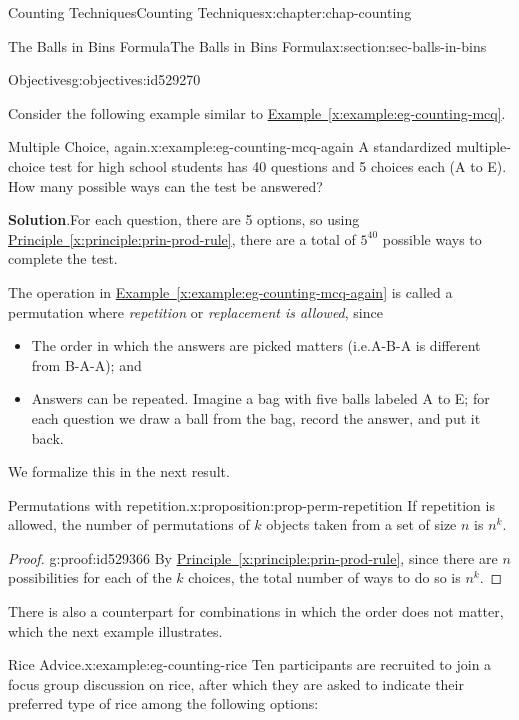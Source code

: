 \documentclass[oneside,10pt,]{book}
\newcommand{\blocktitlefont}{\relax}
\newcommand{\xreffont}{\relax}
\numberwithin{equation}{section}
\begin{document}
\begin{chapterptx}{Counting Techniques}{}{Counting Techniques}{}{}{x:chapter:chap-counting}
\begin{sectionptx}{The Balls in Bins Formula}{}{The Balls in Bins Formula}{}{}{x:section:sec-balls-in-bins}
\begin{objectives}{Objectives}{g:objectives:id529270}
\begin{itemize}[label=\textbullet]
\end{itemize}
\end{objectives}
Consider the following example similar to \hyperref[x:example:eg-counting-mcq]{Example~{\xreffont\ref{x:example:eg-counting-mcq}}}.%
\begin{example}{Multiple Choice, again.}{x:example:eg-counting-mcq-again}%
A standardized multiple-choice test for high school students has 40 questions and 5 choices each (A to E). How many possible ways can the test be answered?%
\par\smallskip%
\noindent\textbf{\blocktitlefont Solution}.\hypertarget{g:solution:id529277}{}\quad{}For each question, there are 5 options, so using \hyperref[x:principle:prin-prod-rule]{Principle~{\xreffont\ref{x:principle:prin-prod-rule}}}, there are a total of \(5^{40}\) possible ways to complete the test.%
\end{example}
The operation in \hyperref[x:example:eg-counting-mcq-again]{Example~{\xreffont\ref{x:example:eg-counting-mcq-again}}} is called a permutation where \emph{repetition} or \emph{replacement is allowed}, since%
\begin{itemize}[label=\textbullet]
\item{}The order in which the answers are picked matters (i.e.\@ A-B-A is different from B-A-A); and%
\item{}Answers can be repeated. Imagine a bag with five balls labeled A to E; for each question we draw a ball from the bag, record the answer, and put it back.%
\end{itemize}
We formalize this in the next result.%
\begin{proposition}{Permutations with repetition.}{}{x:proposition:prop-perm-repetition}%
If repetition is allowed, the number of permutations of \(k\) objects taken from a set of size \(n\) is \(n^k\).%
\end{proposition}
\begin{proof}{}{g:proof:id529366}
By \hyperref[x:principle:prin-prod-rule]{Principle~{\xreffont\ref{x:principle:prin-prod-rule}}}, since there are \(n\) possibilities for each of the \(k\) choices, the total number of ways to do so is \(n^k\).%
\end{proof}
There is also a counterpart for combinations in which the order does not matter, which the next example illustrates.%
\begin{example}{Rice Advice.}{x:example:eg-counting-rice}%
Ten participants are recruited to join a focus group discussion on rice, after which they are asked to indicate their preferred type of rice among the following options:%

\end{example}
\end{sectionptx}
\end{chapterptx}
\end{document}
